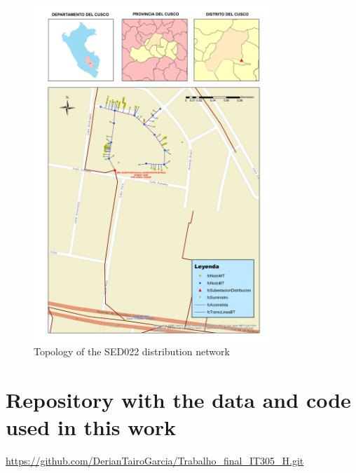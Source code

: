 \documentclass[12pt, 3p]{elsarticle}
\begin{document}
\begin{figure}[!t]
    \centering
    \includegraphics[width=0.8\textwidth]{./Figures/SED_0010022.pdf}
    \caption{Topology of the SED022 distribution network}
    \label{fig:topology}
\end{figure}

\section{Repository with the data and code used in this work}
\label{appndx:repository}

\url{https://github.com/DerianTairoGarcia/Trabalho_final_IT305_H.git}



\end{document}
